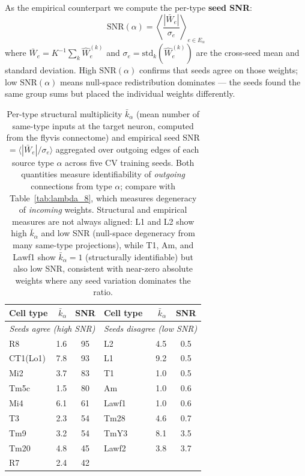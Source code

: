 \documentclass[11pt,a4paper]{article}
\begin{document}
As the empirical counterpart we compute the per-type \textbf{seed SNR}:
\begin{equation}
\mathrm{SNR}(\alpha) = \left\langle\frac{|\bar{W}_e|}{\sigma_e}\right\rangle_{e\in E_\alpha}
\end{equation}
where $\bar{W}_e = K^{-1}\sum_k \hat{W}_e^{(k)}$ and $\sigma_e =
\mathrm{std}_k(\hat{W}_e^{(k)})$ are the cross-seed mean and standard
deviation.  High $\mathrm{SNR}(\alpha)$ confirms that seeds agree on
those weights; low $\mathrm{SNR}(\alpha)$ means null-space redistribution
dominates --- the seeds found the same group sums but placed the individual
weights differently.

\begin{table}[h!]
\centering
\footnotesize
\begin{tabular}{lrc|lrc}
\toprule
Cell type & $\bar{k}_\alpha$ & SNR &
Cell type & $\bar{k}_\alpha$ & SNR \\
\midrule
\multicolumn{3}{c|}{\textit{Seeds agree (high SNR)}} &
\multicolumn{3}{c}{\textit{Seeds disagree (low SNR)}} \\
\midrule
R8       & 1.6 & 95  & L2     & 4.5 & 0.5 \\
CT1(Lo1) & 7.8 & 93  & L1     & 9.2 & 0.5 \\
Mi2      & 3.7 & 83  & T1     & 1.0 & 0.5 \\
Tm5c     & 1.5 & 80  & Am     & 1.0 & 0.6 \\
Mi4      & 6.1 & 61  & Lawf1  & 1.0 & 0.6 \\
T3       & 2.3 & 54  & Tm28   & 4.6 & 0.7 \\
Tm9      & 3.2 & 54  & TmY3   & 8.1 & 3.5 \\
Tm20     & 4.8 & 45  & Lawf2  & 3.8 & 3.7 \\
R7       & 2.4 & 42  &        &     &     \\
\bottomrule
\end{tabular}
\caption{Per-type structural multiplicity $\bar{k}_\alpha$ (mean number of same-type
inputs at the target neuron, computed from the flyvis connectome) and empirical seed SNR
$= \langle|\bar{W}_e|/\sigma_e\rangle$ aggregated over outgoing edges of each source
type $\alpha$ across five CV training seeds.  Both quantities measure identifiability
of \emph{outgoing} connections from type $\alpha$; compare with
Table~\ref{tab:lambda_8}, which measures degeneracy of \emph{incoming} weights.
Structural and empirical measures are not always aligned: L1 and L2 show
high $\bar{k}_\alpha$ and low SNR (null-space degeneracy from many same-type projections),
while T1, Am, and Lawf1 show $\bar{k}_\alpha=1$ (structurally identifiable) but also
low SNR, consistent with near-zero absolute weights where any seed variation
dominates the ratio.}
\label{tab:snr}
\end{table}
\end{document}
